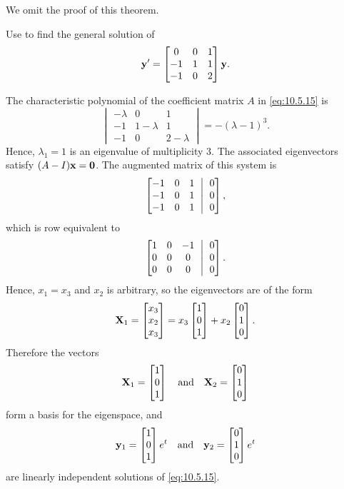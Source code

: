 We omit the proof of this theorem.



\begin{example}\label{example:10.5.5}
Use  to find the general solution of
\begin{equation}\label{eq:10.5.15}
\mathbf{y}'=\begin{bmatrix}0&0&1\\-1&1&1\\-1&0&2\end{bmatrix}\mathbf{y}.
\end{equation}
\end{example}

\begin{solution}
The characteristic polynomial of
the coefficient matrix $A$ in  \eqref{eq:10.5.15} is
\[
\begin{vmatrix}
-\lambda & 0 & 1\\ -1 & 1-\lambda &1\\ -1 & 0 & 2-\lambda
\end{vmatrix} =-(\lambda-1)^3.
\]
Hence,  $\lambda_1=1$ is
an eigenvalue of multiplicity $3$.  The associated eigenvectors
satisfy $(A-I)\mathbf{x}=\mathbf{0}$. The  augmented
matrix of this system is
\[
\amatrix{-1&0&1\\-1&0&1\\-1&0&1}{0\\0\\0},
 \]
which is row equivalent to
\[
\amatrix{1&0&-1\\0&0&0\\0&0&0}{0\\0\\0}.
\]
Hence, $x_1 =x_3$ and  $x_2$ is arbitrary, so the eigenvectors are  of
the form
\[
\mathbf{X}_1=\begin{bmatrix}x_3\\x_2\\x_3\end{bmatrix}=x_3\begin{bmatrix}1\\0\\1\end{bmatrix}+x_2\begin{bmatrix}0\\1\\0\end{bmatrix}.
\]
Therefore the vectors
\begin{equation}\label{eq:10.5.16}
\mathbf{X}_1  =\begin{bmatrix}1\\0\\1\end{bmatrix}\quad\text{and}\quad \mathbf{X}_2=\begin{bmatrix}0\\1\\0\end{bmatrix}
\end{equation}
form a basis for the eigenspace, and
\[
\mathbf{y}_1  =\begin{bmatrix}1\\0\\1\end{bmatrix}e^t\quad\text{and}\quad \mathbf{y}_2=\begin{bmatrix}0\\1\\0\end{bmatrix}e^t
\]
are linearly independent solutions of   \eqref{eq:10.5.15}.


\end{solution}
